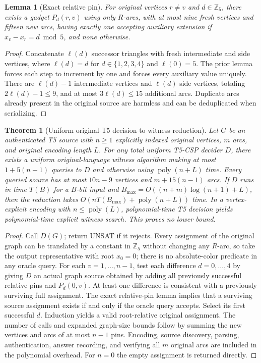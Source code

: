 \documentclass[11pt]{article}
\newtheorem{theorem}{Theorem}
\newtheorem{lemma}{Lemma}
\begin{document}
\begin{lemma}[Exact relative pin]
For original vertices $r\ne v$ and $d\in\mathbb Z_5$,
there exists a gadget $P_d(r,v)$ using only $R$-arcs,
with at most nine fresh vertices and fifteen new arcs,
having exactly one accepting auxiliary extension if
$x_v-x_r=d\bmod5$, and none otherwise.
\end{lemma}
\begin{proof}
Concatenate $\ell(d)$ successor triangles with fresh
intermediate and side vertices, where $\ell(d)=d$ for
$d\in\{1,2,3,4\}$ and $\ell(0)=5$.
The prior lemma forces each step to increment by one
and forces every auxiliary value uniquely.
There are $\ell(d)-1$ intermediate vertices and
$\ell(d)$ side vertices, totaling $2\ell(d)-1\le9$,
and at most $3\ell(d)\le15$ additional arcs.
Duplicate arcs already present in the original source
are harmless and can be deduplicated when serializing.
\end{proof}

\begin{theorem}[Uniform original-T5 decision-to-witness reduction]
Let $G$ be an authenticated T5 source with $n\ge1$ explicitly
indexed original vertices, $m$ arcs, and original encoding length $L$.
For any total uniform T5-CSP decider $D$, there exists a
uniform original-language witness algorithm making at most
$1+5(n-1)$ queries to $D$ and otherwise using
$\operatorname{poly}(n+L)$ time.
Every queried source has at most $10n-9$ vertices and
$m+15(n-1)$ arcs. If $D$ runs in time $T(B)$ for a
$B$-bit input and
$B_{\max}=O((n+m)\log(n+1)+L)$, then the reduction
takes $O(nT(B_{\max})+\operatorname{poly}(n+L))$ time.
In a vertex-explicit encoding with $n\le\operatorname{poly}(L)$,
polynomial-time T5 decision yields polynomial-time
explicit witness search. This proves no lower bound.
\end{theorem}
\begin{proof}
Call $D(G)$; return UNSAT if it rejects.
Every assignment of the original graph can be translated
by a constant in $\mathbb Z_5$ without changing any $R$-arc,
so take the output representative with root $x_0=0$;
there is no absolute-color predicate in any oracle query.
For each $v=1,\ldots,n-1$, test each difference
$d=0,\ldots,4$ by giving $D$ an actual graph source
obtained by adding all previously successful relative
pins and $P_d(0,v)$. At least one difference is consistent
with a previously surviving full assignment.
The exact relative-pin lemma implies that a surviving
source assignment exists if and only if the oracle query
accepts. Select its first successful $d$.
Induction yields a valid root-relative original assignment.
The number of calls and expanded graph-size bounds follow
by summing the new vertices and arcs of at most $n-1$ pins.
Encoding, source discovery, parsing, authentication,
answer recording, and verifying all $m$ original arcs
are included in the polynomial overhead.
For $n=0$ the empty assignment is returned directly.
\end{proof}
\end{document}
